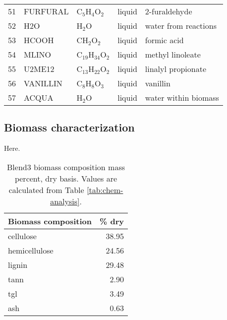 \begin{center}
\begin{longtable}{cllll}
        51 & FURFURAL       & C$_5$H$_4$O$_2$         & \cellcolor{blue!25}liquid        & 2-furaldehyde \\
        52 & H2O            & H$_2$O                  & \cellcolor{blue!25}liquid        & water from reactions \\
        53 & HCOOH          & CH$_2$O$_2$             & \cellcolor{blue!25}liquid        & formic acid \\
        54 & MLINO          & C$_{19}$H$_{34}$O$_2$   & \cellcolor{blue!25}liquid        & methyl linoleate \\
        55 & U2ME12         & C$_{13}$H$_{22}$O$_2$   & \cellcolor{blue!25}liquid        & linalyl propionate \\
        56 & VANILLIN       & C$_8$H$_8$O$_3$         & \cellcolor{blue!25}liquid        & vanillin \\
        57 & ACQUA          & H$_2$O                  & \cellcolor{blue!25}liquid        & water within biomass \\
        \bottomrule
    \end{longtable}
\end{center}

\subsection{Biomass characterization}

Here.

\begin{table}[H]
    \centering
    \caption{Blend3 biomass composition mass percent, dry basis. Values are calculated from Table \ref{tab:chem-analysis}.}
    \begin{tabular}{lr}
        \toprule
        Biomass composition & \% dry \\
        \midrule
        cellulose     & 38.95 \\
        hemicellulose & 24.56 \\
        lignin        & 29.48 \\
        tann          & 2.90  \\
        tgl           & 3.49  \\
        ash           & 0.63  \\
        \bottomrule
    \end{tabular}
\end{table}
